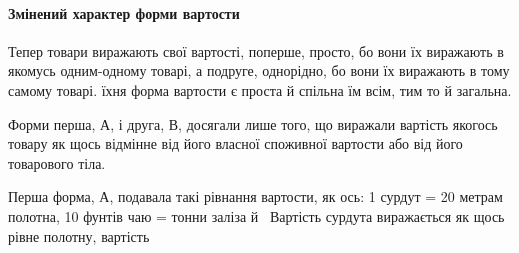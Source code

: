 \paragraph{Змінений характер форми вартости}

Тепер товари виражають свої вартості, поперше, просто, бо
вони їх виражають в яко\-мусь од\-ним-од\-но\-му товарі, а подруге,
однорідно, бо вони їх виражають в тому самому товарі. їхня форма
вартости є проста й спільна їм всім, тим то й загальна.

Форми перша, А, і друга, В, досягали лише того, що виражали
вартість якогось товару як щось відмінне від його власної
споживної вартости або від його товарового тіла.

Перша форма, А, подавала такі рівнання вартости, як ось: 1 сурдут
= 20 метрам полотна, 10 фунтів чаю =  тонни заліза й~
Вартість сурдута виражається як щось рівне полотну, вартість
\parbreak{}  %
